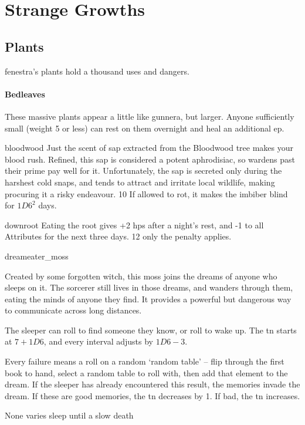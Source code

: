 \chapter{Strange Growths}
\label{growths}

\section{Plants}
\label{plants}

\begin{multicols}{2}

\noindent
\Gls{fenestra}'s plants hold a thousand uses and dangers.

\subsubsection{Bedleaves}
\label{bedleaves}
These massive plants appear a little like gunnera, but larger.
Anyone sufficiently small (\gls{weight} 5 or less) can rest on them overnight and heal an additional \gls{ep}.

%
  {bloodwood}%
  {Just the scent of sap extracted from the Bloodwood tree makes your blood rush.
  Refined, this sap is considered a potent aphrodisiac, so \glspl{warden} past their prime pay well for it.
  Unfortunately, the sap is secreted only during the harshest cold snaps, 
  and tends to attract and irritate local wildlife, making procuring it a risky endeavour.
  }
  {}%
  {10}%
  {If allowed to rot, it makes the imbiber blind for $1D6^2$ days.}

%
  {downroot}%
  {Eating the root gives +2 \glspl{hp} after a night's rest, and -1 to all Attributes for the next three days.
  }
  {}%
  {12}%
  {only the penalty applies.}%

%
  {dreameater_moss}%
  {
    Created by some forgotten witch, this moss joins the dreams of anyone who sleeps on it.
    The sorcerer still lives in those dreams, and wanders through them, eating the minds of anyone they find.
    It provides a powerful but dangerous way to communicate across long distances.

    The sleeper can roll  to find someone they know, or roll  to wake up.
    The \gls{tn} starts at $7 + 1D6$, and every \gls{interval} adjusts by $1D6 - 3$.

    Every failure means a roll on a random `random table' -- flip through the first book to hand, select a random table to roll with, then add that element to the dream.
    If the sleeper has already encountered this result, the memories invade the dream.
    If these are good memories, the \gls{tn} decreases by 1.
    If bad, the \gls{tn} increases.
  }
  {None}%
  {varies}%
  {sleep until a slow death}%


\end{multicols}
